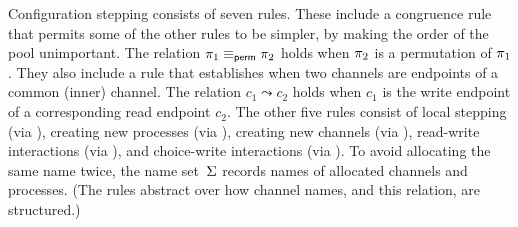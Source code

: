 Configuration stepping consists of seven rules. These include a congruence
rule  that permits some of the other rules to be simpler, by making
the order of the pool unimportant. The relation
$\pi_1 \equiv_\textsf{perm} \pi_2$ holds when $\pi_2$ is a permutation of
$\pi_1$. They also include a rule  that establishes
when two channels are endpoints of a common (inner) channel. The relation
$c_1 \leadsto c_2$ holds when $c_1$ is the write endpoint of a corresponding
read endpoint $c_2$.
%
The other five rules consist of local stepping (via ),
creating new processes (via ),
creating new channels (via ),
read-write interactions (via ),
and choice-write interactions (via ).
%
To avoid allocating the same name twice, 
the name set~$\Sigma$ records names of allocated channels and processes.
%
%
(The rules abstract over how channel names, and this relation, are structured.)



